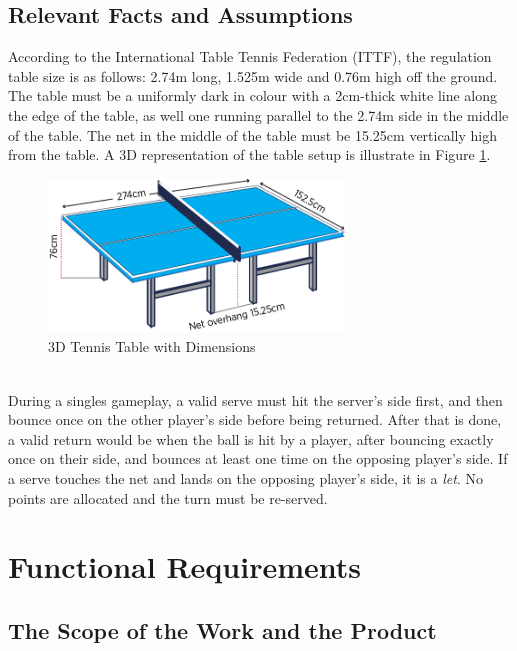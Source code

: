 \documentclass[11pt]{article}
\begin{document}
\subsection{Relevant Facts and Assumptions}
According to the International Table Tennis Federation (ITTF), the regulation table size is as follows: 2.74m long, 1.525m wide and 0.76m high off the ground. The table must be a uniformly dark in colour with a 2cm-thick white line along the edge of the table, as well one running parallel to the 2.74m side in the middle of the table. The net in the middle of the table must be 15.25cm vertically high from the table. A 3D representation of the table setup is illustrate in Figure \ref{fig:table-tennis-dim}.
\begin{figure}[htbp]
   \centering
   \includegraphics[width=0.7\textwidth]{../img/table-tennis-dim.png} %
   \caption{3D Tennis Table with Dimensions}
   \label{fig:table-tennis-dim}
\end{figure} \\
During a singles gameplay, a valid serve must hit the server's side first, and then bounce once on the other player's side before being returned. After that is done, a valid return would be when the ball is hit by a player, after bouncing exactly once on their side, and bounces at least one time on the opposing player's side. If a serve touches the net and lands on the opposing player's side, it is a \textit{let}. No points are allocated and the turn must be re-served.
\section{Functional Requirements}

\subsection{The Scope of the Work and the Product}
\end{document}
